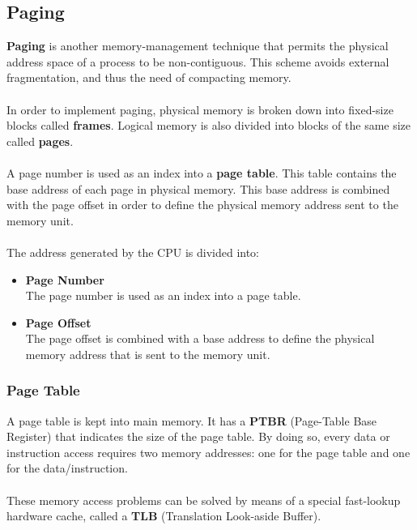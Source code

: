 \documentclass{article}
\begin{document}
\subsection{Paging}
\textbf{Paging} is another memory-management technique that permits the physical address space of a process to be non-contiguous. This scheme avoids external fragmentation, and thus the need of compacting memory. \\ \\
In order to implement paging, physical memory is broken down into fixed-size blocks called \textbf{frames}. Logical memory is also divided into blocks of the same size called \textbf{pages}. \\ \\
A page number is used as an index into a \textbf{page table}. This table contains the base address of each page in physical memory. This base address is combined with the page offset in order to define the physical memory address sent to the memory unit. \\ \\
The address generated by the CPU is divided into:

\begin{itemize}
	\item \textbf{Page Number}
	\vspace{.2cm} \\
 	The page number is used as an index into a page table.
 	
 	\item \textbf{Page Offset}
 	\vspace{.2cm} \\
 	The page offset is combined with a base address to define the physical memory address that is sent to the memory unit.
\end{itemize}

\subsubsection{Page Table}
A page table is kept into main memory. It has a \textbf{PTBR} (Page-Table Base Register) that indicates the size of the page table. By doing so, every data or instruction access requires two memory addresses: one for the page table and one for the data/instruction. \\ \\
These memory access problems can be solved by means of a special fast-lookup hardware cache, called a \textbf{TLB} (Translation Look-aside Buffer).
\end{document}
